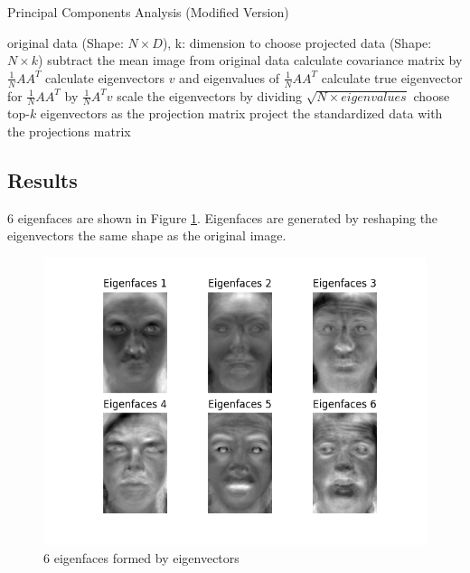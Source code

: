 \documentclass{article}
\begin{document}
\begin{algorithm}
        \caption{Principal Components Analysis (Modified Version)}
        \begin{algorithmic}[1]
            \Require original data (Shape: $N\times D$), k: dimension to choose
            \Ensure  projected data (Shape: $N\times k$)
             \State subtract the mean image from original data
             \State calculate covariance matrix by $\frac{1}{N}AA^T$
             \State calculate eigenvectors $v$ and eigenvalues of $\frac{1}{N}AA^T$
             \State calculate true eigenvector for $\frac{1}{N}AA^T$ by $\frac{1}{N}A^Tv$
             \State scale the eigenvectors by dividing $\sqrt{N\times eigenvalues}$
             \State choose top-$k$ eigenvectors as the projection matrix
             \State project the standardized data with the projections matrix
        \end{algorithmic}
\end{algorithm}
\par

\subsection{Results}
6 eigenfaces are shown in Figure \ref{figure: eigenfaces}. Eigenfaces are generated by reshaping the eigenvectors the same shape as the original image.
\begin{figure}[ht]
\begin{center}
\includegraphics[scale=0.5]{images/eigenfaces.png}
\end{center}
\caption{6 eigenfaces formed by eigenvectors}
\label{figure: eigenfaces}
\end{figure}
\end{document}
